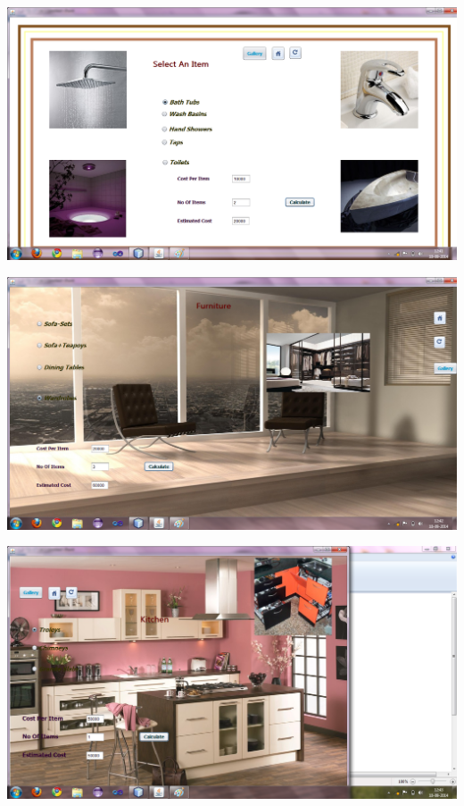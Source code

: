 \documentclass[12pt,a4paper]{report}
\begin{document}
\begin{center}
\includegraphics[scale=0.45]{7.png}
\end{center}
\begin{center}
\includegraphics[scale=0.45]{8.png}
\end{center}
\begin{center}
\includegraphics[scale=0.45]{9.png}
\end{center}
\end{document}
